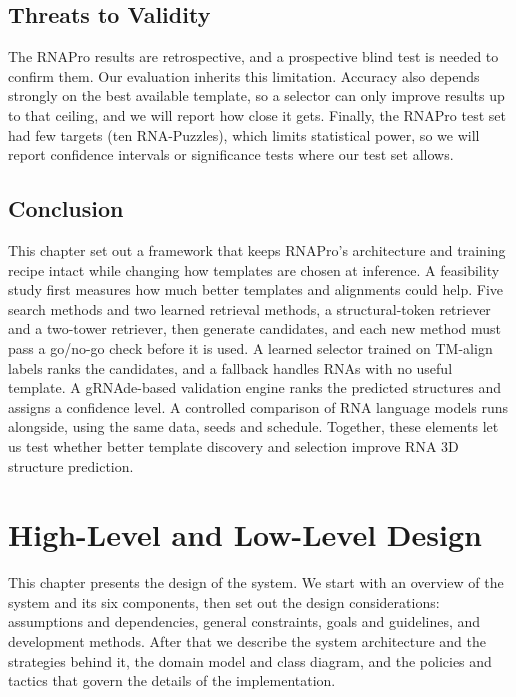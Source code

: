\documentclass{FastFyp}
\begin{document}
\section{Threats to Validity}
The RNAPro results are retrospective, and a prospective blind test is needed to confirm them. Our evaluation inherits this limitation. Accuracy also depends strongly on the best available template, so a selector can only improve results up to that ceiling, and we will report how close it gets. Finally, the RNAPro test set had few targets (ten RNA-Puzzles), which limits statistical power, so we will report confidence intervals or significance tests where our test set allows.

\section{Conclusion}
This chapter set out a framework that keeps RNAPro's architecture and training recipe intact while changing how templates are chosen at inference. A feasibility study first measures how much better templates and alignments could help. Five search methods and two learned retrieval methods, a structural-token retriever and a two-tower retriever, then generate candidates, and each new method must pass a go/no-go check before it is used. A learned selector trained on TM-align labels ranks the candidates, and a fallback handles RNAs with no useful template. A gRNAde-based validation engine ranks the predicted structures and assigns a confidence level. A controlled comparison of RNA language models runs alongside, using the same data, seeds and schedule. Together, these elements let us test whether better template discovery and selection improve RNA 3D structure prediction.
\clearpage

\chapter{High-Level and Low-Level Design}
\label{ch:design}
This chapter presents the design of the system. We start with an overview of the system and its six components, then set out the design considerations: assumptions and dependencies, general constraints, goals and guidelines, and development methods. After that we describe the system architecture and the strategies behind it, the domain model and class diagram, and the policies and tactics that govern the details of the implementation.
\end{document}
